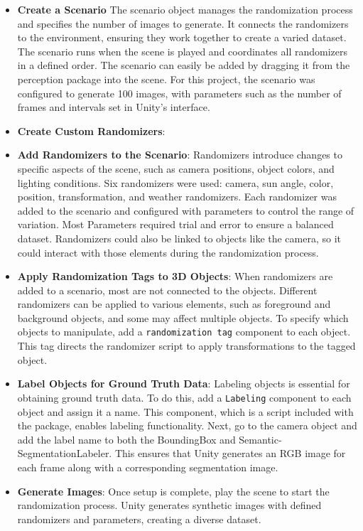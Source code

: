 \begin{itemize} \item \textbf{Create a Scenario}
The scenario object manages the randomization process and specifies the number of images to generate. It connects the randomizers to the environment, ensuring they work together to create a varied dataset. The scenario runs when the scene is played and coordinates all randomizers in a defined order.\cite{borkman2021unityperceptiongeneratesynthetic} The scenario can easily be added by dragging it from the perception package into the scene. For this project, the scenario was configured to generate 100 images, with parameters such as the number of frames and intervals set in Unity’s interface.

\item \textbf{Create Custom Randomizers}: 


\item \textbf{Add Randomizers to the Scenario}: Randomizers introduce changes to specific aspects of the scene, such as camera positions, object colors, and lighting conditions. Six randomizers were used: camera, sun angle, color, position, transformation, and weather randomizers. Each randomizer was added to the scenario and configured with parameters to control the range of variation. Most Parameters required trial and error to ensure a balanced dataset. Randomizers could also be linked to objects like the camera, so it could interact with those elements during the randomization process.

\item \textbf{Apply Randomization Tags to 3D Objects}: When randomizers are added to a scenario, most are not connected to the objects. Different randomizers can be applied to various elements, such as foreground and background objects, and some may affect multiple objects. To specify which objects to manipulate, add a \texttt{randomization tag} component to each object. This tag directs the randomizer script to apply transformations to the tagged object.

\item \textbf{Label Objects for Ground Truth Data}: Labeling objects is essential for obtaining ground truth data. To do this, add a \texttt{Labeling} component to each object and assign it a name. This component, which is a script included with the package, enables labeling functionality. Next, go to the camera object and add the label name to both the BoundingBox and Semantic- SegmentationLabeler. This ensures that Unity generates an RGB image for each frame along with a corresponding segmentation image.

\item \textbf{Generate Images}: Once setup is complete, play the scene to start the randomization process. Unity generates synthetic images with defined randomizers and parameters, creating a diverse dataset.
\end{itemize}


